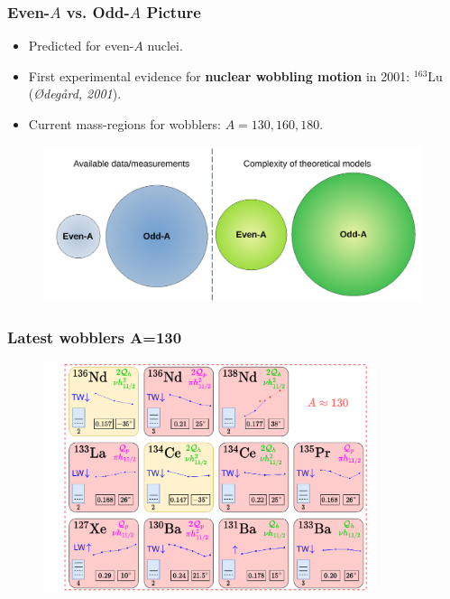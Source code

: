 \documentclass{beamer}
\begin{document}
\begin{frame}
	\frametitle{Even-$A$ vs. Odd-$A$ Picture}
	\begin{itemize}
		\item Predicted for even-$A$ nuclei.
		\item First experimental evidence for \textbf{nuclear wobbling motion} in 2001: $^{163}$Lu (\textit{Ødegård, 2001}).
		\item Current mass-regions for wobblers: $A=130,160,180$.
	\end{itemize}
	\begin{figure}
		\centering
		\includegraphics[width=0.99\textwidth]{figures/even-vs-odda.pdf}
	\end{figure}
\end{frame}

\begin{frame}
	\frametitle{Latest wobblers A=130}
	\begin{figure}
		\centering
		\includegraphics[width=0.87\textwidth]{figures/wobblers-chart-2.pdf}
	\end{figure}
\end{frame}
\end{document}
